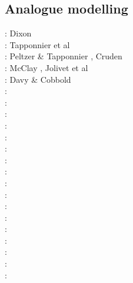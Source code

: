 \subsection{Analogue modelling}

{\scriptsize
\nineteenseventyfive: Dixon \cite{dixo75}\\
\nineteeneightytwo: Tapponnier et al \cite{tapl82}\\
\nineteeneightyeight: Peltzer \& Tapponnier \cite{peta88}, Cruden \cite{crud88}\\
\nineteenninety: McClay \cite{mccl90}, Jolivet et al \cite{jodc90}\\
\nineteenninetyone: Davy \& Cobbold \cite{daco91}\\
\nineteenninetytwo: \cite{salt92}\\
\nineteenninetythree: \cite{nabr93}\cite{shem93}\\
\nineteenninetyseven: \cite{vank97}\\
\nineteenninetyeight: \cite{bubr98}\\
\nineteenninetynine: \cite{dava99}\cite{befo99}\cite{fagd99}\cite{nagg99}\\
\twothousand: \cite{sche00}\cite{sobm00}\cite{chlb00}\\
\twothousandone: \cite{haki01}\cite{chys01}\\
\twothousandtwo: \cite{dagl02}\\
\twothousandthree: \cite{smbs03}\cite{muso03}\cite{nagv03}\\
\twothousandfour: \cite{sche04}\cite{sche04b}\\
\twothousandfive: \cite{jujb05}\cite{sche05}\cite{sobb05}\\
\twothousandsix: \cite{scbb06}\cite{tibs06}\cite{crnp06}\cite{lemm06}\cite{pabs06}\cite{malm06}\\
\twothousandseven: \cite{socb07}\\
\twothousandeight: \cite{clbz08}\cite{fufh08}\cite{esfm08}\\
\twothousandnine: \cite{pina09}\cite{bonn09}\\
\twothousandeleven: \cite{dalt11}\cite{gopc11}\cite{grhd11}\\
\twothousandtwelve: \cite{grmd12}\cite{iadc12}\\
}
